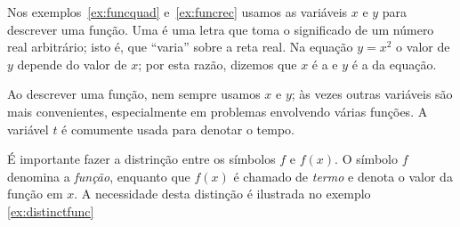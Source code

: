 \documentclass{svmono}
\begin{document}
Nos exemplos~\ref{ex:funcquad} e~\ref{ex:funcrec} usamos as variáveis
$x$ e $y$ para descrever uma função. Uma  é uma
letra que toma o significado de um número real arbitrário; isto é,
que ``varia'' sobre a reta real. Na equação $y = x^2$ o valor de $y$
depende do valor de $x$; por esta razão, dizemos que $x$ é a
 e $y$ é a
 da equação.

Ao descrever uma função, nem sempre usamos $x$ e $y$;
às vezes outras variáveis são mais convenientes, especialmente
em problemas envolvendo várias funções. A variável $t$ é comumente
usada para denotar o tempo.

É importante fazer a distrinção entre os símbolos $f$ e 
$f(x)$. O símbolo $f$ denomina a \emph{função}, enquanto que
$f(x)$ é chamado de \emph{termo} e denota o valor da função
em $x$. A necessidade desta distinção é ilustrada no exemplo~%
\ref{ex:distinctfunc}
\end{document}
